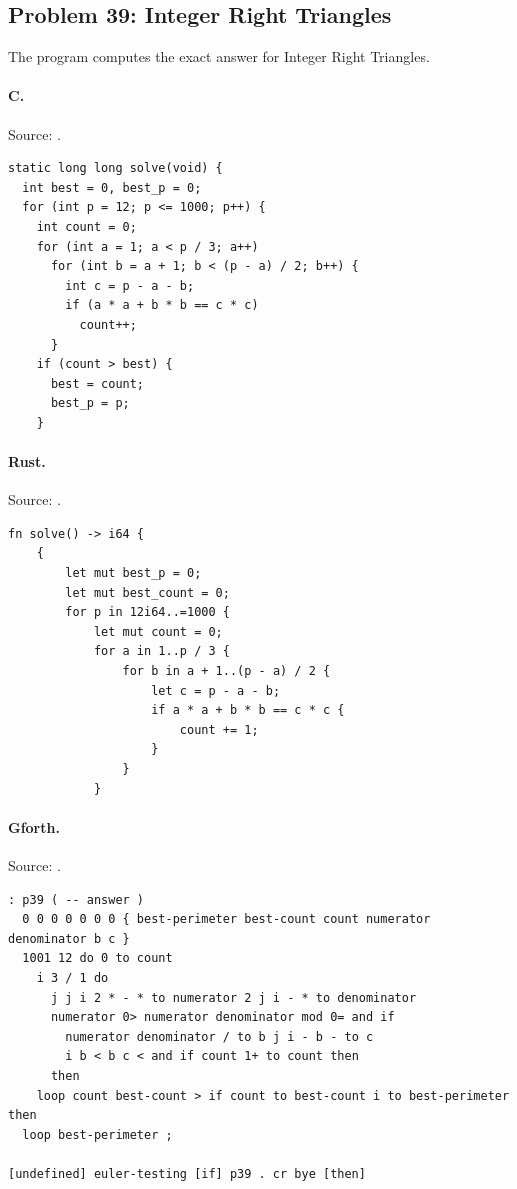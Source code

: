 \subsection{Problem 39: Integer Right Triangles}
\label{walkthrough:p39}
The program computes the exact answer for Integer Right Triangles.

\paragraph{C.} Source: .
\begin{lstlisting}
static long long solve(void) {
  int best = 0, best_p = 0;
  for (int p = 12; p <= 1000; p++) {
    int count = 0;
    for (int a = 1; a < p / 3; a++)
      for (int b = a + 1; b < (p - a) / 2; b++) {
        int c = p - a - b;
        if (a * a + b * b == c * c)
          count++;
      }
    if (count > best) {
      best = count;
      best_p = p;
    }
\end{lstlisting}

\paragraph{Rust.} Source: .
\begin{lstlisting}
fn solve() -> i64 {
    {
        let mut best_p = 0;
        let mut best_count = 0;
        for p in 12i64..=1000 {
            let mut count = 0;
            for a in 1..p / 3 {
                for b in a + 1..(p - a) / 2 {
                    let c = p - a - b;
                    if a * a + b * b == c * c {
                        count += 1;
                    }
                }
            }
\end{lstlisting}

\paragraph{Gforth.} Source: .
\begin{lstlisting}
: p39 ( -- answer )
  0 0 0 0 0 0 0 { best-perimeter best-count count numerator denominator b c }
  1001 12 do 0 to count
    i 3 / 1 do
      j j i 2 * - * to numerator 2 j i - * to denominator
      numerator 0> numerator denominator mod 0= and if
        numerator denominator / to b j i - b - to c
        i b < b c < and if count 1+ to count then
      then
    loop count best-count > if count to best-count i to best-perimeter then
  loop best-perimeter ;

[undefined] euler-testing [if] p39 . cr bye [then]
\end{lstlisting}

